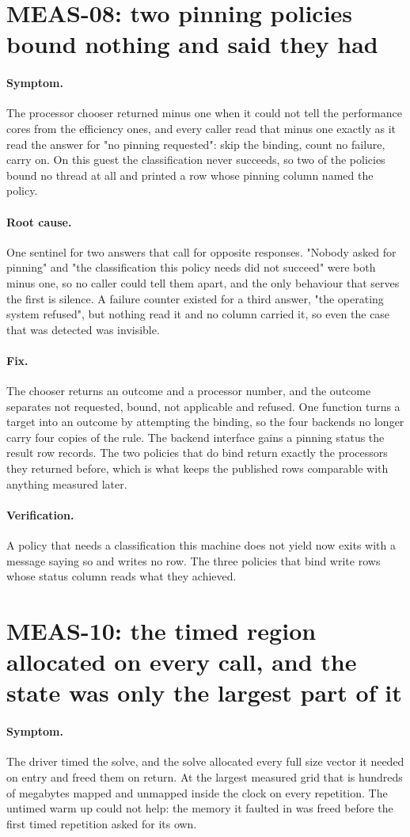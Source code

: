 \documentclass[11pt,a4paper]{report}
\newcommand{\symptom}[1]{\paragraph{Symptom.}#1}
\newcommand{\rootcause}[1]{\paragraph{Root cause.}#1}
\newcommand{\fix}[1]{\paragraph{Fix.}#1}
\newcommand{\verification}[1]{\paragraph{Verification.}#1}
\begin{document}
\section{MEAS-08: two pinning policies bound nothing and said they had}

\symptom{The processor chooser returned minus one when it could not tell the
performance cores from the efficiency ones, and every caller read that minus one
exactly as it read the answer for "no pinning requested": skip the binding, count
no failure, carry on. On this guest the classification never succeeds, so two of
the policies bound no thread at all and printed a row whose pinning column named
the policy.}

\rootcause{One sentinel for two answers that call for opposite responses. "Nobody
asked for pinning" and "the classification this policy needs did not succeed"
were both minus one, so no caller could tell them apart, and the only behaviour
that serves the first is silence. A failure counter existed for a third answer,
"the operating system refused", but nothing read it and no column carried it, so
even the case that was detected was invisible.}

\fix{The chooser returns an outcome and a processor number, and the outcome
separates not requested, bound, not applicable and refused. One function turns a
target into an outcome by attempting the binding, so the four backends no longer
carry four copies of the rule. The backend interface gains a pinning status the
result row records. The two policies that do bind return exactly the processors
they returned before, which is what keeps the published rows comparable with
anything measured later.}

\verification{A policy that needs a classification this machine does not yield
now exits with a message saying so and writes no row. The three policies that
bind write rows whose status column reads what they achieved.}

\section{MEAS-10: the timed region allocated on every call, and the state was only the largest part of it}

\symptom{The driver timed the solve, and the solve allocated every full size
vector it needed on entry and freed them on return. At the largest measured grid
that is hundreds of megabytes mapped and unmapped inside the clock on every
repetition. The untimed warm up could not help: the memory it faulted in was
freed before the first timed repetition asked for its own.}
\end{document}
